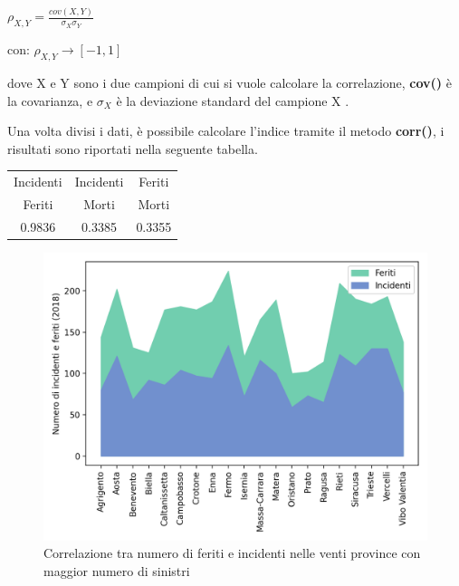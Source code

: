 \documentclass[a4paper]{report}
\newcommand{\methodstyle}[1]{\textbf{#1}}
\begin{document}
\begin{center}
    $\rho_{X, Y} = \displaystyle \frac{cov(X, Y)}{\sigma_X \sigma_Y}$
\end{center}

\begin{center}
    con: $\rho_{X, Y} \rightarrow [-1, 1]$
\end{center}

dove X e Y sono i due campioni di cui si vuole calcolare la correlazione, 
\methodstyle{cov()} è la covarianza, e $\sigma_X$ è la deviazione standard del 
campione X \cite{PROB_E_STATISTICA:3}.

Una volta divisi i dati, è possibile calcolare l'indice tramite il metodo 
\methodstyle{corr()}, i risultati sono riportati nella seguente tabella.

\begin{center}
    \def\arraystretch{1.5}%
    \begin{tabular}{ |c|c|c| } 
    \hline
    Incidenti & Incidenti & Feriti \\ 
    Feriti & Morti & Morti \\ 
    \hline
    0.9836 & 0.3385 & 0.3355 \\ 
    \hline
    \end{tabular}
\end{center}

\begin{figure}
    \includegraphics[width=\linewidth]{../src/incidenti/incidenti_aci/provincia/corr_incidenti.png}
    \caption{Correlazione tra numero di feriti e incidenti nelle venti province con maggior numero di sinistri}
    \label{fig:corr-incidenti-feriti}
\end{figure}
\end{document}

